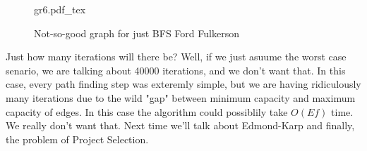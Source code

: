 \documentclass[12pt]{article}
\begin{document}
\begin{figure}[ht]
	\centering
	\def\svgwidth{\columnwidth}
	{gr6.pdf_tex}
	\caption{Not-so-good graph for just BFS Ford Fulkerson}
	\label{fig:gr6}
\end{figure}

Just how many iterations will there be? Well, if we just asuume the worst case senario, we are talking about 40000 iterations, and we don't want that.
In this case, every path finding step was exteremly simple, but we are having ridiculously many iterations due to the wild "gap" between minimum capacity and maximum capacity of edges. In this case the algorithm could possiblily take $O(Ef)$ time. We really don't want that. Next time we'll talk about Edmond-Karp and finally, the problem of Project Selection.
\end{document}
